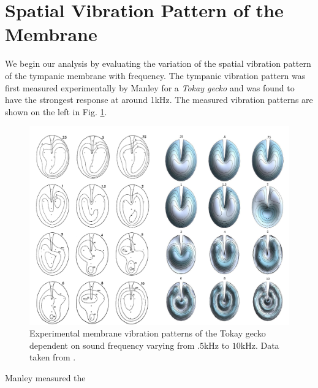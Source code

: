 \section{Spatial Vibration Pattern of the Membrane}
We begin our analysis by evaluating the variation of the spatial vibration pattern of the tympanic membrane
with frequency. The tympanic vibration pattern was first measured experimentally by Manley \cite{manleygecko1}
for a \textit{Tokay gecko} and was found to have the strongest response at around 1kHz. The measured vibration patterns
are shown on the left in Fig. \ref{manleygeckotympanum}.
\begin{figure}[ht!]
 \centering
 \includegraphics[width=1.0\linewidth]{Diagrams/manleymodelcomparison.png}
 \caption[Tokay gecko tympanum vibration profiles.]{Experimental membrane vibration patterns of the Tokay gecko dependent
 on sound frequency varying from $.5$kHz to $10$kHz. Data taken from \cite{manleygecko1}.}
  \label{manleygeckotympanum}
\end{figure}
Manley measured the 


